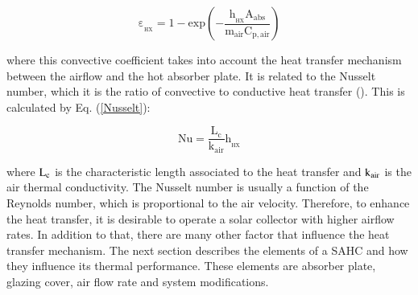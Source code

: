 \begin{equation}
	\mathrm{\varepsilon_{\!_{HX}} = 1 - exp\left(-\frac{h_{\!_{HX}}A_{abs}}{m_{air}C_{p,air}}\right)}
	\label{effectiveness}
\end{equation}

\noindent where this convective coefficient takes into account the heat transfer mechanism between the airflow and the hot absorber plate. It is related to the Nusselt number, which it is the ratio of convective to conductive heat transfer (\cite{Incropera2006}). This is calculated by Eq. (\ref{Nusselt}):
	
\begin{equation}
	\mathrm{Nu = \frac{L_c}{k_{air}}{h_{\!_{HX}}}}
	\label{Nusselt}
\end{equation}

\noindent where $\rm{L_c}$ is the characteristic length associated to the heat transfer and $\rm{k_{air}}$ is the air thermal conductivity. The Nusselt number is usually a function of the Reynolds number, which is proportional to the air velocity. Therefore, to enhance the heat transfer, it is desirable to operate a solar collector with higher airflow rates. In addition to that, there are many other factor that influence the heat transfer mechanism. The next section describes the elements of a SAHC and how they influence its thermal performance. These elements are absorber plate, glazing cover, air flow rate and system modifications.



